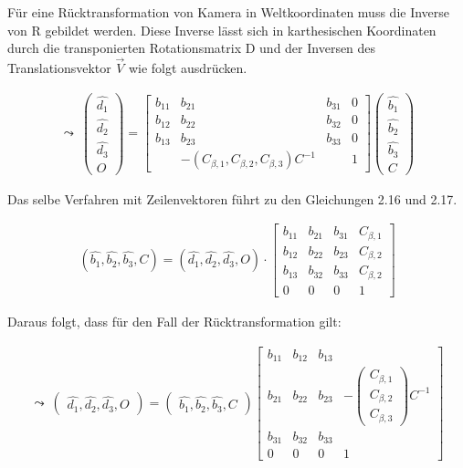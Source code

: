 Für eine Rücktransformation von Kamera in Weltkoordinaten muss die Inverse von R gebildet werden. Diese Inverse lässt sich in karthesischen Koordinaten durch die transponierten Rotationsmatrix D und der Inversen des Translationsvektor $\vec{V}$ wie folgt ausdrücken.

\begin{gather}
	\leadsto \: \begin{pmatrix}
		\hat{d_1}\\
		\hat{d_2}\\
		\hat{d_3}\\
		O
	\end{pmatrix} = 
	\begin{bmatrix}
		b_{11} & b_{21} & b_{31} & 0\\
		b_{12} & b_{22} & b_{32} & 0\\
		b_{13} & b_{23} & b_{33} & 0\\
		&-(	C_{\beta,1}, C_{\beta,2}, C_{\beta,3})C^{-1}& & 1
	\end{bmatrix}
	\begin{pmatrix}
		\hat{b_1}\\
		\hat{b_2}\\
		\hat{b_3}\\
		C
	\end{pmatrix}
\end{gather}

Das selbe Verfahren mit Zeilenvektoren führt zu den Gleichungen 2.16 und 2.17.

\begin{gather}
	(\hat{b_1}, \hat{b_2}, \hat{b_3}, C) = (\hat{d_1},\hat{d_2}, \hat{d_3}, O) \cdot
	\begin{bmatrix} 
		b_{11} & b_{21} & b_{31} & C_{\beta,1}\\
		b_{12} & b_{22} & b_{23} & C_{\beta,2}\\
		b_{13} & b_{32} & b_{33} & C_{\beta,2}\\
		0           &       0       &   0         & 1   
	\end{bmatrix}
\end{gather}	

Daraus folgt, dass für den Fall der Rücktransformation gilt:

\begin{gather}
	\leadsto \: \begin{pmatrix}
		\hat{d_1},\hat{d_2},\hat{d_3},O
	\end{pmatrix} = 
	\begin{pmatrix}
		\hat{b_1},\hat{b_2},\hat{b_3},C
	\end{pmatrix}
	\begin{bmatrix}
		b_{11} & b_{12} & b_{13} & \\
		b_{21} & b_{22} & b_{23} &  -\begin{pmatrix}
			C_{\beta,1}\\
			C_{\beta,2}\\
			C_{\beta,3}
		\end{pmatrix}C^{-1}\\
		b_{31} & b_{32} & b_{33} & \\
		0&0&0 & 1
	\end{bmatrix}
\end{gather}	

